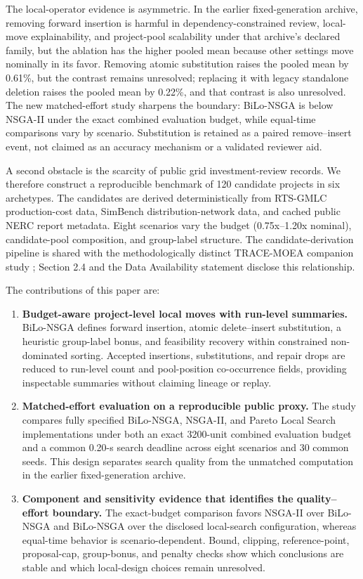 \documentclass[applsci,article,submit,moreauthors]{Definitions/mdpi}
\providecommand{\tightlist}{\setlength{\itemsep}{0pt}\setlength{\parskip}{0pt}}
\begin{document}
The local-operator evidence is asymmetric. In the earlier fixed-generation archive, removing forward insertion is harmful in dependency-constrained review, local-move explainability, and project-pool scalability under that archive's declared family, but the ablation has the higher pooled mean because other settings move nominally in its favor. Removing atomic substitution raises the pooled mean by 0.61\%, but the contrast remains unresolved; replacing it with legacy standalone deletion raises the pooled mean by 0.22\%, and that contrast is also unresolved. The new matched-effort study sharpens the boundary: BiLo-NSGA is below NSGA-II under the exact combined evaluation budget, while equal-time comparisons vary by scenario. Substitution is retained as a paired remove--insert event, not claimed as an accuracy mechanism or a validated reviewer aid.

A second obstacle is the scarcity of public grid investment-review records. We therefore construct a reproducible benchmark of 120 candidate projects in six archetypes. The candidates are derived deterministically from RTS-GMLC production-cost data, SimBench distribution-network data, and cached public NERC report metadata. Eight scenarios vary the budget (0.75x--1.20x nominal), candidate-pool composition, and group-label structure. The candidate-derivation pipeline is shared with the methodologically distinct TRACE-MOEA companion study \cite{ref33}; Section 2.4 and the Data Availability statement disclose this relationship.

The contributions of this paper are:

\begin{enumerate}
\def\labelenumi{\arabic{enumi}.}
\tightlist
\item
  \textbf{Budget-aware project-level local moves with run-level summaries.} BiLo-NSGA defines forward insertion, atomic delete--insert substitution, a heuristic group-label bonus, and feasibility recovery within constrained non-dominated sorting. Accepted insertions, substitutions, and repair drops are reduced to run-level count and pool-position co-occurrence fields, providing inspectable summaries without claiming lineage or replay.
\item
  \textbf{Matched-effort evaluation on a reproducible public proxy.} The study compares fully specified BiLo-NSGA, NSGA-II, and Pareto Local Search implementations under both an exact 3200-unit combined evaluation budget and a common 0.20-s search deadline across eight scenarios and 30 common seeds. This design separates search quality from the unmatched computation in the earlier fixed-generation archive.
\item
  \textbf{Component and sensitivity evidence that identifies the quality--effort boundary.} The exact-budget comparison favors NSGA-II over BiLo-NSGA and BiLo-NSGA over the disclosed local-search configuration, whereas equal-time behavior is scenario-dependent. Bound, clipping, reference-point, proposal-cap, group-bonus, and penalty checks show which conclusions are stable and which local-design choices remain unresolved.
\end{enumerate}
\end{document}
